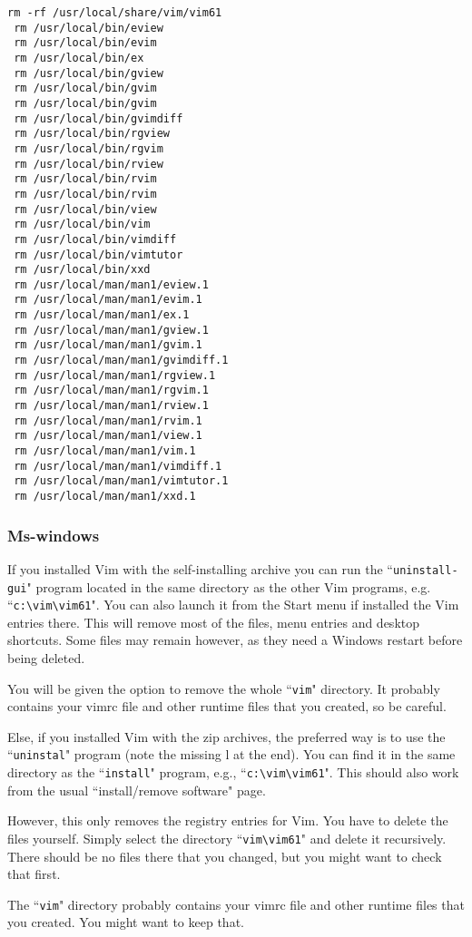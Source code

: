 \begin{Verbatim}[samepage=true]
 rm -rf /usr/local/share/vim/vim61
 rm /usr/local/bin/eview
 rm /usr/local/bin/evim
 rm /usr/local/bin/ex
 rm /usr/local/bin/gview
 rm /usr/local/bin/gvim
 rm /usr/local/bin/gvim
 rm /usr/local/bin/gvimdiff
 rm /usr/local/bin/rgview
 rm /usr/local/bin/rgvim
 rm /usr/local/bin/rview
 rm /usr/local/bin/rvim
 rm /usr/local/bin/rvim
 rm /usr/local/bin/view
 rm /usr/local/bin/vim
 rm /usr/local/bin/vimdiff
 rm /usr/local/bin/vimtutor
 rm /usr/local/bin/xxd
 rm /usr/local/man/man1/eview.1
 rm /usr/local/man/man1/evim.1
 rm /usr/local/man/man1/ex.1
 rm /usr/local/man/man1/gview.1
 rm /usr/local/man/man1/gvim.1
 rm /usr/local/man/man1/gvimdiff.1
 rm /usr/local/man/man1/rgview.1
 rm /usr/local/man/man1/rgvim.1
 rm /usr/local/man/man1/rview.1
 rm /usr/local/man/man1/rvim.1
 rm /usr/local/man/man1/view.1
 rm /usr/local/man/man1/vim.1
 rm /usr/local/man/man1/vimdiff.1
 rm /usr/local/man/man1/vimtutor.1
 rm /usr/local/man/man1/xxd.1
\end{Verbatim}

\subsubsection{Ms-windows}
If you installed Vim with the self-installing archive you can run the ``\texttt{uninstall-gui}" program located in the same directory as the other Vim programs, e.g. ``\texttt{c:\textbackslash{}vim\textbackslash{}vim61}".
You can also launch it from the Start menu if installed the Vim entries there.
This will remove most of the files, menu entries and desktop shortcuts.
Some files may remain however, as they need a Windows restart before being deleted.

You will be given the option to remove the whole ``\texttt{vim}" directory.
It probably contains your vimrc file and other runtime files that you created, so be careful.

Else, if you installed Vim with the zip archives, the preferred way is to use the ``\texttt{uninstal}" program (note the missing l at the end).
You can find it in the same directory as the ``\texttt{install}" program, e.g., ``\texttt{c:\textbackslash{}vim\textbackslash{}vim61}".
This should also work from the usual ``install/remove software" page.

However, this only removes the registry entries for Vim.
You have to delete the files yourself.
Simply select the directory ``\texttt{vim\textbackslash{}vim61}" and delete it recursively.
There should be no files there that you changed, but you might want to check that first.

The ``\texttt{vim}" directory probably contains your vimrc file and other runtime files that you created.
You might want to keep that.
\clearpage
